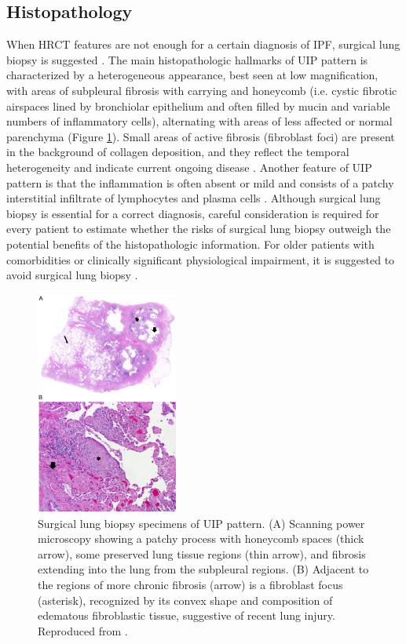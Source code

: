 \subsection{Histopathology}
When HRCT features are not enough for a certain diagnosis of IPF, surgical lung biopsy is suggested \citep{richeldi2017idiopathic}. The main histopathologic hallmarks of UIP pattern is characterized by a heterogeneous appearance, best seen at low magnification, with areas of subpleural fibrosis with carrying and honeycomb (i.e. cystic fibrotic airspaces lined by bronchiolar epithelium and often filled by mucin and variable numbers of inflammatory cells), alternating with areas of less affected or normal parenchyma \citep{ american2000idiopathic, travis2002american} (Figure \ref{fig:SurgicalLungBiopsy}). Small areas of active fibrosis (fibroblast foci) are present in the background of collagen deposition, and they reflect the temporal heterogeneity and indicate current ongoing disease \citep{king2011idiopathic}. Another feature of UIP pattern is that the inflammation is often absent or mild and consists of a patchy interstitial infiltrate of lymphocytes and plasma cells \citep{raghu2011official,king2011idiopathic}. Although surgical lung biopsy is essential for a correct diagnosis, careful consideration is required for every patient to estimate whether the risks of surgical lung biopsy outweigh the potential benefits of the histopathologic information. For older patients with comorbidities or clinically significant physiological impairment, it is suggested to avoid surgical lung biopsy \citep{richeldi2017idiopathic}.

\begin{figure}[htbp]
  \centering 
  \includegraphics[height=2.9in]{Background/Image/SurgicalLungBiopsy.png}
  \caption{ Surgical lung biopsy specimens of UIP pattern. (A) Scanning power microscopy showing a patchy process with honeycomb
spaces (thick arrow), some preserved lung tissue regions (thin arrow), and fibrosis extending into the lung from the subpleural regions. (B) Adjacent to the regions of more chronic fibrosis (arrow) is a fibroblast focus (asterisk), recognized by its convex shape and composition of edematous fibroblastic tissue, suggestive of recent lung injury. Reproduced from \citep{raghu2011official}.}
  \label{fig:SurgicalLungBiopsy}
\end{figure}

